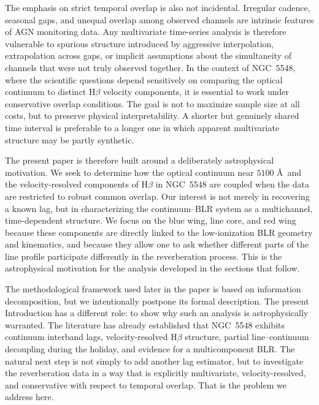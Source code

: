 \documentclass[fleqn,usenatbib]{mnras}
\begin{document}
The emphasis on strict temporal overlap is also not incidental. Irregular cadence, seasonal gaps, and unequal overlap among observed channels are intrinsic features of AGN monitoring data. Any multivariate time-series analysis is therefore vulnerable to spurious structure introduced by aggressive interpolation, extrapolation across gaps, or implicit assumptions about the simultaneity of channels that were not truly observed together. In the context of NGC~5548, where the scientific questions depend sensitively on comparing the optical continuum to distinct H$\beta$ velocity components, it is essential to work under conservative overlap conditions. The goal is not to maximize sample size at all costs, but to preserve physical interpretability. A shorter but genuinely shared time interval is preferable to a longer one in which apparent multivariate structure may be partly synthetic.

The present paper is therefore built around a deliberately astrophysical motivation. We seek to determine how the optical continuum near \(5100\) \AA\ and the velocity-resolved components of H$\beta$ in NGC~5548 are coupled when the data are restricted to robust common overlap. Our interest is not merely in recovering a known lag, but in characterizing the continuum--BLR system as a multichannel, time-dependent structure. We focus on the blue wing, line core, and red wing because these components are directly linked to the low-ionization BLR geometry and kinematics, and because they allow one to ask whether different parts of the line profile participate differently in the reverberation process. This is the astrophysical motivation for the analysis developed in the sections that follow.

The methodological framework used later in the paper is based on information decomposition, but we intentionally postpone its formal description. The present Introduction has a different role: to show why such an analysis is astrophysically warranted. The literature has already established that NGC~5548 exhibits continuum interband lags, velocity-resolved H$\beta$ structure, partial line--continuum decoupling during the holiday, and evidence for a multicomponent BLR. The natural next step is not simply to add another lag estimator, but to investigate the reverberation data in a way that is explicitly multivariate, velocity-resolved, and conservative with respect to temporal overlap. That is the problem we address here.
\end{document}
